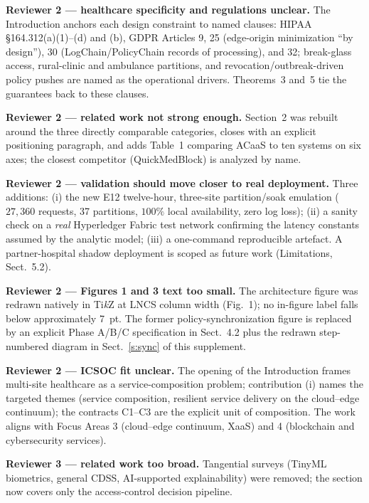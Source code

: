\documentclass[runningheads]{llncs}
\begin{document}
\smallskip\noindent\textbf{Reviewer 2 --- healthcare specificity and regulations unclear.}
The Introduction anchors each design constraint to named clauses: HIPAA \S164.312(a)(1)--(d) and (b), GDPR Articles 9, 25 (edge-origin minimization ``by design''), 30 (LogChain/PolicyChain records of processing), and 32; break-glass access, rural-clinic and ambulance partitions, and revocation/outbreak-driven policy pushes are named as the operational drivers. Theorems~3 and~5 tie the guarantees back to these clauses.

\smallskip\noindent\textbf{Reviewer 2 --- related work not strong enough.}
Section~2 was rebuilt around the three directly comparable categories, closes with an explicit positioning paragraph, and adds Table~1 comparing ACaaS to ten systems on six axes; the closest competitor (QuickMedBlock) is analyzed by name.

\smallskip\noindent\textbf{Reviewer 2 --- validation should move closer to real deployment.}
Three additions: (i) the new E12 twelve-hour, three-site partition/soak emulation ($27{,}360$ requests, 37 partitions, $100\%$ local availability, zero log loss); (ii) a sanity check on a \emph{real} Hyperledger Fabric test network confirming the latency constants assumed by the analytic model; (iii) a one-command reproducible artefact. A partner-hospital shadow deployment is scoped as future work (Limitations, Sect.~5.2).

\smallskip\noindent\textbf{Reviewer 2 --- Figures 1 and 3 text too small.}
The architecture figure was redrawn natively in Ti\emph{k}Z at LNCS column width (Fig.~1); no in-figure label falls below approximately 7~pt. The former policy-synchronization figure is replaced by an explicit Phase A/B/C specification in Sect.~4.2 plus the redrawn step-numbered diagram in Sect.~\ref{s:sync} of this supplement.

\smallskip\noindent\textbf{Reviewer 2 --- ICSOC fit unclear.}
The opening of the Introduction frames multi-site healthcare as a service-composition problem; contribution (i) names the targeted themes (service composition, resilient service delivery on the cloud--edge continuum); the contracts \textsf{C1}--\textsf{C3} are the explicit unit of composition. The work aligns with Focus Areas 3 (cloud--edge continuum, XaaS) and 4 (blockchain and cybersecurity services).

\smallskip\noindent\textbf{Reviewer 3 --- related work too broad.}
Tangential surveys (TinyML biometrics, general CDSS, AI-supported explainability) were removed; the section now covers only the access-control decision pipeline.
\end{document}
